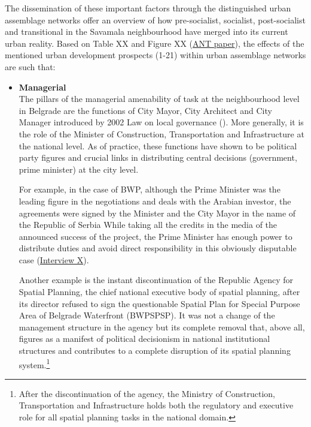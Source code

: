 \documentclass[11pt]{report}
\begin{document}
The dissemination of these important factors through the distinguished urban assemblage networks offer an overview of how pre-socialist, socialist, post-socialist and transitional in the Savamala neighbourhood have merged into its current urban reality.
Based on Table XX and Figure XX (\href{ref}{ANT paper}), the effects of the mentioned urban development prospects (1-21) within urban assemblage networks are such that:
\\

\begin{itemize}
\item \textbf{Managerial}
\\
The pillars of the managerial amenability of task at the neighbourhood level in Belgrade are the functions of City Mayor, City Architect and City Manager introduced by 2002 Law on local governance (\href{ref}{\citealt{vujovic_belgrades_2007}}).
More generally, it is the role of the Minister of Construction, Transportation and Infrastructure at the national level.
As of practice, these functions have shown to be political party figures and crucial links in distributing central decisions (government, prime minister) at the city level.

For example, in the case of BWP, although the Prime Minister was the leading figure in the negotiations and deals with the Arabian investor, the agreements were signed by the Minister and the City Mayor in the name of the Republic of Serbia
While taking all the credits in the media of the announced success of the project, the Prime Minister has enough power to distribute duties and avoid direct responsibility in this obviously disputable case (\href{InterviewX}{Interview X}).

Another example is the instant discontinuation of the Republic Agency for Spatial Planning, the chief national executive body of spatial planning, after its director refused to sign the questionable Spatial Plan for Special Purpose Area of Belgrade Waterfront (BWPSPSP). It was not a change of the management structure in the agency but its complete removal that, above all, figures as a manifest of political decisionism in national institutional structures and contributes to a complete disruption of its spatial planning system.\footnote{After the discontinuation of the agency, the Ministry of Construction, Transportation and Infrastructure holds both the regulatory and executive role for all spatial planning tasks in the national domain.}


\end{itemize}
\end{document}
